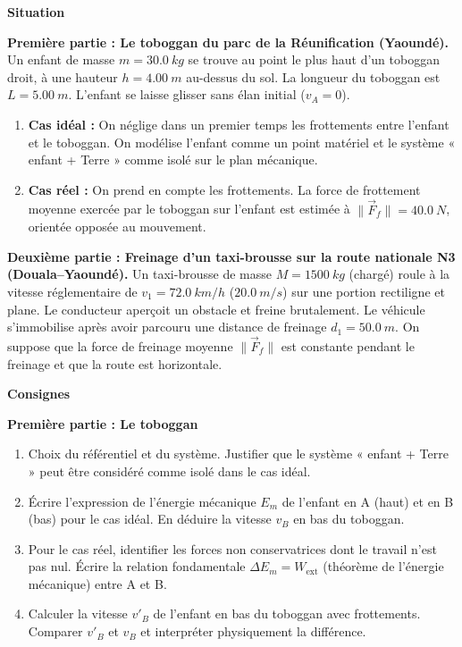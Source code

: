 \documentclass[11pt]{article}
\begin{document}
\begin{exoresolu}
\textbf{Situation}

\noindent \textbf{Première partie : Le toboggan du parc de la Réunification (Yaoundé).}
Un enfant de masse $m = \SI{30,0}{kg}$ se trouve au point le plus haut d'un toboggan droit, à une hauteur $h = \SI{4,00}{m}$ au-dessus du sol. La longueur du toboggan est $L = \SI{5,00}{m}$. L'enfant se laisse glisser sans élan initial ($v_A = 0$).
\begin{enumerate}
    \item \textbf{Cas idéal :} On néglige dans un premier temps les frottements entre l'enfant et le toboggan. On modélise l'enfant comme un point matériel et le système « enfant + Terre » comme isolé sur le plan mécanique.
    \item \textbf{Cas réel :} On prend en compte les frottements. La force de frottement moyenne exercée par le toboggan sur l'enfant est estimée à $\|\vec{F}_f\| = \SI{40,0}{N}$, orientée opposée au mouvement.
\end{enumerate}

\noindent \textbf{Deuxième partie : Freinage d'un taxi-brousse sur la route nationale N3 (Douala--Yaoundé).}
Un taxi-brousse de masse $M = \SI{1500}{kg}$ (chargé) roule à la vitesse réglementaire de $v_1 = \SI{72,0}{km/h}$ ($\SI{20,0}{m/s}$) sur une portion rectiligne et plane. Le conducteur aperçoit un obstacle et freine brutalement. Le véhicule s'immobilise après avoir parcouru une distance de freinage $d_1 = \SI{50,0}{m}$. On suppose que la force de freinage moyenne $\|\vec{F}_f\|$ est constante pendant le freinage et que la route est horizontale.

\textbf{Consignes}

\noindent \textbf{Première partie : Le toboggan}
\begin{enumerate}
    \item Choix du référentiel et du système. Justifier que le système « enfant + Terre » peut être considéré comme isolé dans le cas idéal.
    \item Écrire l'expression de l'énergie mécanique $E_m$ de l'enfant en A (haut) et en B (bas) pour le cas idéal. En déduire la vitesse $v_B$ en bas du toboggan.
    \item Pour le cas réel, identifier les forces non conservatrices dont le travail n'est pas nul. Écrire la relation fondamentale $\Delta E_m = W_{\text{ext}}$ (théorème de l'énergie mécanique) entre A et B.
    \item Calculer la vitesse $v'_B$ de l'enfant en bas du toboggan avec frottements. Comparer $v'_B$ et $v_B$ et interpréter physiquement la différence.
\end{enumerate}


\end{exoresolu}
\end{document}
